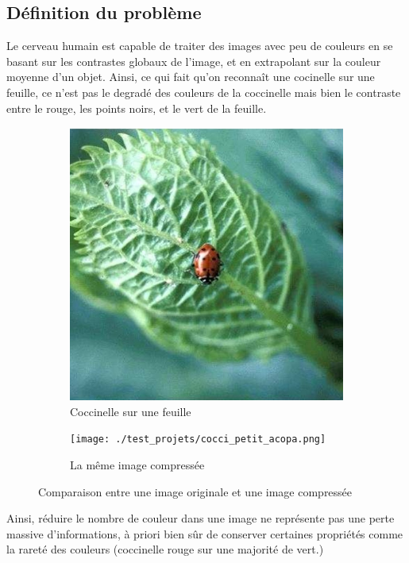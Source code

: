 \documentclass{article}
\begin{document}
\subsection{Définition du problème}
Le cerveau humain est capable de traiter des images avec peu de couleurs en se basant sur les contrastes globaux de l'image, et en extrapolant sur la couleur moyenne d'un objet. Ainsi, ce qui fait qu'on reconnaît une cocinelle sur une feuille, ce n'est pas le degradé des couleurs de la coccinelle mais bien le contraste entre le rouge, les points noirs, et le vert de la feuille. 
    \begin{figure}[h]
        \begin{subfigure}{0.5\textwidth}
            \centering
            \includegraphics{./images_test/cocci_petit.jpg}
            \caption{Coccinelle sur une feuille}
            \label{fig :image1}
        \end{subfigure}
        \begin{subfigure}{0.5\textwidth}
            \centering
            \texttt{[image: ./test\_projets/cocci\_petit\_acopa.png]}
            \caption{La même image compressée}
            \label{fig :image2}
        \end{subfigure}
        \caption{Comparaison entre une image originale et une image compressée}
        \label{fig: side by side}
    \end{figure}
Ainsi, réduire le nombre de couleur dans une image ne représente pas une perte massive d'informations, à priori bien sûr de conserver certaines propriétés comme la rareté des couleurs (coccinelle rouge sur une majorité de vert.)
\end{document}
